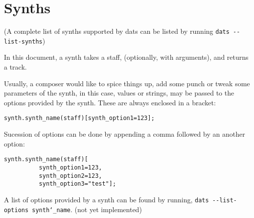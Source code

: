 
\section{Synths}
(A complete list of synths supported by dats can be listed by running \texttt{dats -{}-list-synths})

\np In this document, a synth takes a staff, (optionally, with arguments), and returns a track.

\np Usually, a composer would like to spice things up, add some punch or tweak some
parameters of the synth, in this case, values or strings, may be passed to the options provided
by the synth. These are always enclosed in a bracket:

\begin{Verbatim}[frame=single]
      synth.synth_name(staff)[synth_option1=123];
\end{Verbatim}

Sucession of options can be done by appending a comma followed by an another option:

\begin{Verbatim}[frame=single]
      synth.synth_name(staff)[
          synth_option1=123,
          synth_option2=123,
          synth_option3="test"];
\end{Verbatim}

\np A list of options provided by a synth can be found by running,
\texttt{dats -{}-list-options synth\char`_name}. (not yet implemented)

